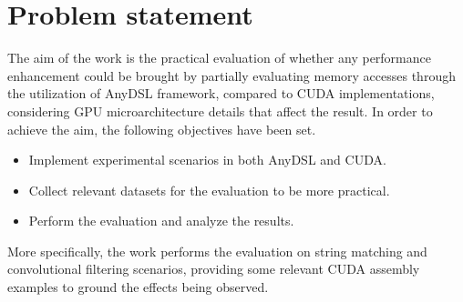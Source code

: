 \section*{Problem statement}\label{ps}
The aim of the work is the practical evaluation of whether any performance enhancement could be brought %
by partially evaluating memory accesses through the utilization of AnyDSL framework, compared to CUDA implementations, considering GPU microarchitecture details that affect the result. In order to achieve the aim, the following objectives have been set.
\begin{itemize}
    \item Implement experimental scenarios in both AnyDSL and CUDA.
    \item Collect relevant datasets for the evaluation to be more practical.
    \item Perform the evaluation and analyze the results.
\end{itemize}

More specifically, the work performs the evaluation on string matching and convolutional filtering scenarios, providing some relevant CUDA assembly examples to ground the effects being observed.




